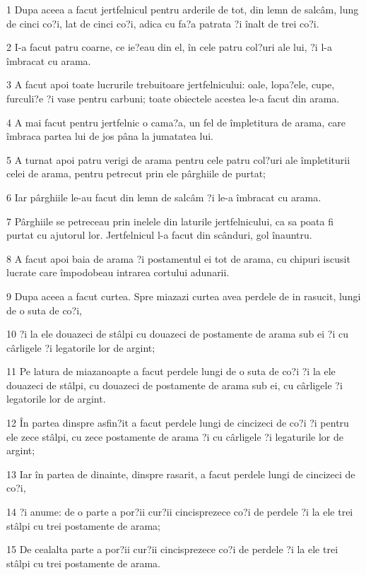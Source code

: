 \par 1 Dupa aceea a facut jertfelnicul pentru arderile de tot, din lemn de salcâm, lung de cinci co?i, lat de cinci co?i, adica cu fa?a patrata ?i înalt de trei co?i.
\par 2 I-a facut patru coarne, ce ie?eau din el, în cele patru col?uri ale lui, ?i l-a îmbracat cu arama.
\par 3 A facut apoi toate lucrurile trebuitoare jertfelnicului: oale, lopa?ele, cupe, furculi?e ?i vase pentru carbuni; toate obiectele acestea le-a facut din arama.
\par 4 A mai facut pentru jertfelnic o cama?a, un fel de împletitura de arama, care îmbraca partea lui de jos pâna la jumatatea lui.
\par 5 A turnat apoi patru verigi de arama pentru cele patru col?uri ale împletiturii celei de arama, pentru petrecut prin ele pârghiile de purtat;
\par 6 Iar pârghiile le-au facut din lemn de salcâm ?i le-a îmbracat cu arama.
\par 7 Pârghiile se petreceau prin inelele din laturile jertfelnicului, ca sa poata fi purtat cu ajutorul lor. Jertfelnicul l-a facut din scânduri, gol înauntru.
\par 8 A facut apoi baia de arama ?i postamentul ei tot de arama, cu chipuri iscusit lucrate care împodobeau intrarea cortului adunarii.
\par 9 Dupa aceea a facut curtea. Spre miazazi curtea avea perdele de in rasucit, lungi de o suta de co?i,
\par 10 ?i la ele douazeci de stâlpi cu douazeci de postamente de arama sub ei ?i cu cârligele ?i legatorile lor de argint;
\par 11 Pe latura de miazanoapte a facut perdele lungi de o suta de co?i ?i la ele douazeci de stâlpi, cu douazeci de postamente de arama sub ei, cu cârligele ?i legatorile lor de argint.
\par 12 În partea dinspre asfin?it a facut perdele lungi de cincizeci de co?i ?i pentru ele zece stâlpi, cu zece postamente de arama ?i cu cârligele ?i legaturile lor de argint;
\par 13 Iar în partea de dinainte, dinspre rasarit, a facut perdele lungi de cincizeci de co?i,
\par 14 ?i anume: de o parte a por?ii cur?ii cincisprezece co?i de perdele ?i la ele trei stâlpi cu trei postamente de arama;
\par 15 De cealalta parte a por?ii cur?ii cincisprezece co?i de perdele ?i la ele trei stâlpi cu trei postamente de arama.
